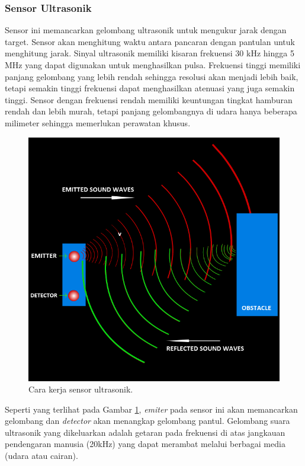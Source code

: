        \subsubsection{Sensor Ultrasonik}
        \label{subsec:Ultrasonik}
        Sensor ini memancarkan gelombang ultrasonik untuk mengukur jarak dengan target. Sensor akan menghitung waktu antara pancaran dengan pantulan untuk menghitung jarak. Sinyal ultrasonik memiliki kisaran frekuensi 30 kHz hingga 5 MHz yang dapat digunakan untuk menghasilkan pulsa. Frekuensi tinggi memiliki panjang gelombang yang lebih rendah sehingga resolusi akan menjadi lebih baik, tetapi semakin tinggi frekuensi dapat menghasilkan atenuasi yang juga semakin tinggi. Sensor dengan frekuensi rendah memiliki keuntungan tingkat hamburan rendah dan lebih murah, tetapi panjang gelombangnya di udara hanya beberapa milimeter sehingga memerlukan perawatan khusus\cite{b4}.
        \begin{figure}[H]
            \centering
            \includegraphics[scale=0.5]{CH02_Ultrasonic.png}
            \caption{Cara kerja sensor ultrasonik\cite{b_g1}.}
            \label{fig:Ch02_ultrasonik}
        \end{figure}
        Seperti yang terlihat pada Gambar \ref{fig:Ch02_ultrasonik}, \textit{emiter} pada sensor ini akan memancarkan gelombang dan \textit{detector} akan menangkap gelombang pantul. Gelombang suara ultrasonik yang dikeluarkan adalah getaran pada frekuensi di atas jangkauan pendengaran manusia (\>20kHz) yang dapat merambat melalui berbagai media (udara atau cairan).
        
